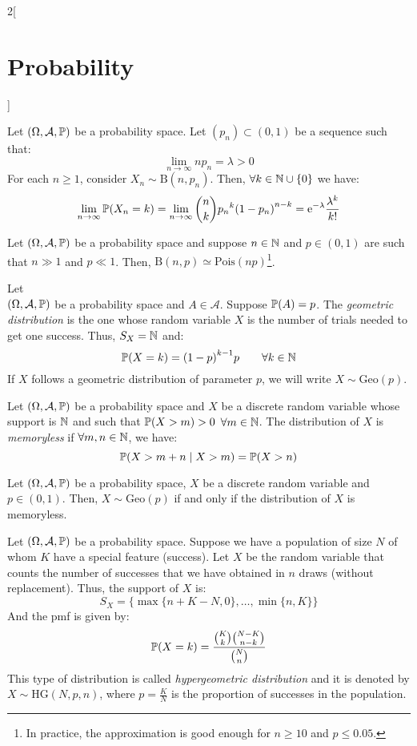 \documentclass[../../../main_math.tex]{subfiles}
\begin{document}
\begin{multicols}{2}[\section{Probability}]
\begin{definition}
  \end{definition}
  \begin{theorem}
    Let $(\Omega,\mathcal{A},\mathbb{P})$ be a probability space. Let $(p_n)\subset(0,1)$ be a sequence such that: $$\lim_{n\to\infty}np_n=\lambda>0$$
    For each $n\geq 1$, consider $X_n\sim \text{B}(n,p_n)$. Then, $\forall k\in\mathbb{N}\cup\{0\}$ we have: $$\lim_{n\to\infty}\mathbb{P}(X_n=k)=\lim_{n\to\infty}\binom{n}{k}{p_n}^k{(1-p_n)}^{n-k}=\mathrm{e}^{-\lambda}\frac{\lambda^k}{k!}$$
  \end{theorem}
  \begin{corollary}
    Let $(\Omega,\mathcal{A},\mathbb{P})$ be a probability space and suppose $n\in\mathbb{N}$ and $p\in (0,1)$ are such that $n\gg 1$ and $p\ll 1$. Then, $\text{B}(n,p)\simeq\text{Pois}(np)$\footnote{In practice, the approximation is good enough for $n\geq 10$ and $p\leq 0.05$.}.
  \end{corollary}
  \begin{definition}
    Let\\ $(\Omega,\mathcal{A},\mathbb{P})$ be a probability space and $A\in\mathcal{A}$. Suppose $\mathbb{P}(A)=p$. The \emph{geometric distribution} is the one whose random variable $X$ is the number of trials needed to get one success. Thus, $S_X=\mathbb{N}$ and: $$\mathbb{P}(X=k)={(1-p)}^{k-1}p\qquad \forall k\in\mathbb{N}$$ If $X$ follows a geometric distribution of parameter $p$, we will write $X\sim \text{Geo}(p)$.
  \end{definition}
  \begin{definition}
    Let $(\Omega,\mathcal{A},\mathbb{P})$ be a probability space and $X$ be a discrete random variable whose support is $\mathbb{N}$ and such that $\mathbb{P}(X >m)>0$ $\forall m\in\mathbb{N}$. The distribution of $X$ is \emph{memoryless} if $\forall m,n\in\mathbb{N}$, we have: $$\mathbb{P}(X>m+n\mid X >m)=\mathbb{P}(X>n)$$
  \end{definition}
  \begin{proposition}
    Let $(\Omega,\mathcal{A},\mathbb{P})$ be a probability space, $X$ be a discrete random variable and $p\in(0,1)$. Then, $X\sim\text{Geo}(p)$ if and only if the distribution of $X$ is memoryless.
  \end{proposition}
  \begin{definition}
    Let $(\Omega,\mathcal{A},\mathbb{P})$ be a probability space. Suppose we have a population of size $N$ of whom $K$ have a special feature (success). Let $X$ be the random variable that counts the number of successes that we have obtained in $n$ draws (without replacement). Thus, the support of $X$ is: $$S_X=\{\max\{n+K-N,0\},\ldots,\min\{n,K\}\}$$ And the pmf is given by: $$\mathbb{P}(X=k)=\frac{\binom{K}{k}\binom{N-K}{n-k}}{\binom{N}{n}}$$ This type of distribution is called \emph{hypergeometric distribution} and it is denoted by $X\sim \text{HG}(N,p,n)$, where $p=\frac{K}{N}$ is the proportion of successes in the population.

\end{definition}
\end{multicols}
\end{document}
